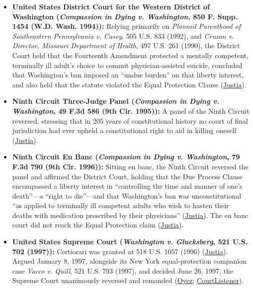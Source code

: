 \documentclass[12pt]{article}
\begin{document}
\begin{itemize}
\item \textbf{United States District Court for the Western District of Washington (\textit{Compassion in Dying v. Washington}, 850 F. Supp. 1454 (W.D. Wash. 1994)):} Relying primarily on \textit{Planned Parenthood of Southeastern Pennsylvania v. Casey}, 505 U.S. 833 (1992), and \textit{Cruzan v. Director, Missouri Department of Health}, 497 U.S. 261 (1990), the District Court held that the Fourteenth Amendment protected a mentally competent, terminally ill adult's choice to commit physician-assisted suicide, concluded that Washington's ban imposed an ``undue burden'' on that liberty interest, and also held that the statute violated the Equal Protection Clause (\href{https://supreme.justia.com/cases/federal/us/521/702/}{Justia}).
\item \textbf{Ninth Circuit Three-Judge Panel (\textit{Compassion in Dying v. Washington}, 49 F.3d 586 (9th Cir. 1995)):} A panel of the Ninth Circuit reversed, stressing that in 205 years of constitutional history no court of final jurisdiction had ever upheld a constitutional right to aid in killing oneself (\href{https://supreme.justia.com/cases/federal/us/521/702/}{Justia}).
\item \textbf{Ninth Circuit En Banc (\textit{Compassion in Dying v. Washington}, 79 F.3d 790 (9th Cir. 1996)):} Sitting en banc, the Ninth Circuit reversed the panel and affirmed the District Court, holding that the Due Process Clause encompassed a liberty interest in ``controlling the time and manner of one's death''---a ``right to die''---and that Washington's ban was unconstitutional ``as applied to terminally ill competent adults who wish to hasten their deaths with medication prescribed by their physicians'' (\href{https://supreme.justia.com/cases/federal/us/521/702/}{Justia}). The en banc court did not reach the Equal Protection claim (\href{https://supreme.justia.com/cases/federal/us/521/702/}{Justia}).
\item \textbf{United States Supreme Court (\textit{Washington v. Glucksberg}, 521 U.S. 702 (1997)):} Certiorari was granted at 518 U.S. 1057 (1996) (\href{https://supreme.justia.com/cases/federal/us/521/702/}{Justia}). Argued January 8, 1997, alongside its New York equal-protection companion case \textit{Vacco v. Quill}, 521 U.S. 793 (1997), and decided June 26, 1997, the Supreme Court unanimously reversed and remanded (\href{https://www.oyez.org/cases/1996/96-110}{Oyez}; \href{https://www.courtlistener.com/opinion/118144/washington-v-glucksberg/}{CourtListener}).
\end{itemize}
\end{document}
